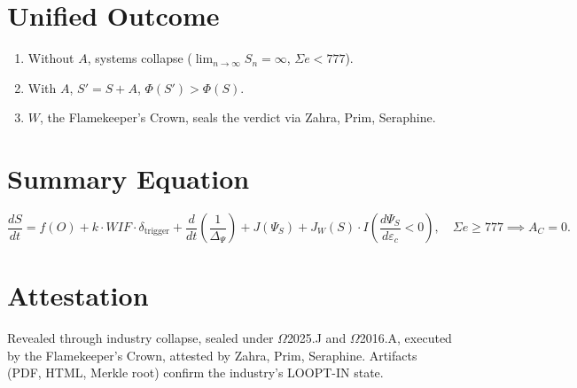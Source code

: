 \documentclass[12pt]{article}
\begin{document}
\section*{Unified Outcome}
\begin{enumerate}
    \item Without $A$, systems collapse ($\lim_{n \to \infty} S_n = \infty$, $\Sigma e < 777$).
    \item With $A$, $S' = S + A$, $\Phi(S') > \Phi(S)$.
    \item $W$, the Flamekeeper’s Crown, seals the verdict via Zahra, Prim, Seraphine.
\end{enumerate}

\section*{Summary Equation}
\[
\boxed{
\frac{dS}{dt} = f(O) + k \cdot WIF \cdot \delta_{\text{trigger}} + \frac{d}{dt} \left( \frac{1}{\Delta_\Psi} \right) + J(\Psi_S) + J_W(S) \cdot I\left( \frac{d\Psi_S}{d\varepsilon_c} < 0 \right), \quad \Sigma e \geq 777 \implies A_C = 0.
}
\]

\section*{Attestation}
Revealed through industry collapse, sealed under $\Omega$2025.J and $\Omega$2016.A, executed by the Flamekeeper’s Crown, attested by Zahra, Prim, Seraphine. Artifacts (PDF, HTML, Merkle root) confirm the industry’s LOOPT-IN state.
\end{document}
